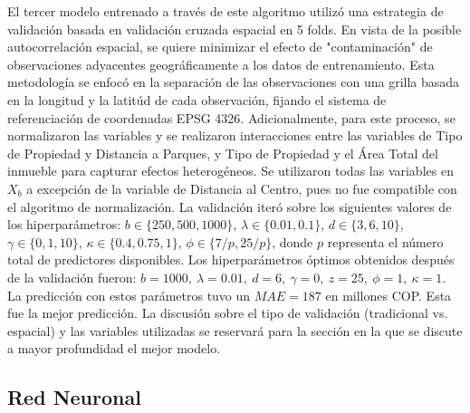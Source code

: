 \documentclass[article,11 pt]{article}
\begin{document}
El tercer modelo entrenado a través de este algoritmo utilizó una estrategia de validación basada en validación cruzada espacial en 5 folds. En vista de la posible autocorrelación espacial, se quiere minimizar el efecto de "contaminación" de observaciones adyacentes geográficamente a los datos de entrenamiento. Esta metodología se enfocó en la separación de las observaciones con una grilla basada en la longitud y la latitúd de cada observación, fijando el sistema de referenciación de coordenadas EPSG 4326. Adicionalmente, para este proceso, se normalizaron las variables y se realizaron interacciones entre las variables de Tipo de Propiedad y Distancia a Parques, y Tipo de Propiedad y el Área Total del inmueble para capturar efectos heterogéneos. Se utilizaron todas las variables en ${X}_b$ a excepción de la variable de Distancia al Centro, pues no fue compatible con el algoritmo de normalización. La validación iteró sobre los siguientes valores de los hiperparámetros: \( b \in \{250, 500, 1000\} \),  \( \lambda \in \{0.01, 0.1\} \), \( d \in \{3, 6, 10\} \), \( \gamma \in \{0, 1, 10\} \), \( \kappa \in \{0.4, 0.75, 1\} \),  \( \phi \in \{7/p, 25/p\} \), donde \( p \) representa el número total de predictores disponibles. Los hiperparámetros óptimos obtenidos después de la validación fueron: $b = 1000,\ \lambda = 0{.}01,\ d = 6,\ \gamma = 0,\ z = 25,\ \phi = 1,\ \kappa = 1$. La predicción con estos parámetros tuvo un $MAE= 187$ en millones COP. Esta fue la mejor predicción. La discusión sobre el tipo de validación (tradicional vs. espacial) y las variables utilizadas se reservará para la sección en la que se discute a mayor profundidad el mejor modelo.


 

\subsection{Red Neuronal}
\end{document}
